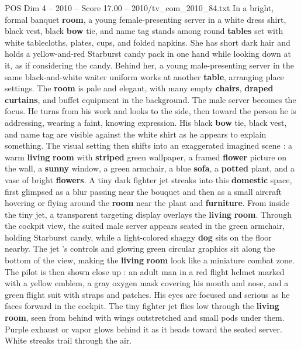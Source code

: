 \begin{textsample}{POS Dim 4 – 2010 – Score 17.00 – 2010/tv\_com\_2010\_84.txt}  \label{ex:f4_pos_028}
In a bright, formal banquet \textbf{room}, a young female-presenting server in a white dress shirt, black vest, black \textbf{bow} tie, and name tag stands among round \textbf{tables} set with white tablecloths, plates, cups, and folded napkins.
She has short dark hair and holds a yellow-and-red Starburst candy pack in one hand while looking down at it, as if considering the candy.
Behind her, a young male-presenting server in the same black-and-white waiter uniform works at another \textbf{table}, arranging place settings.
The \textbf{room} is pale and elegant, with many empty \textbf{chairs}, \textbf{draped} \textbf{curtains}, and buffet equipment in the background.
The male server becomes the focus.
He turns from his work and looks to the side, then toward the person he is addressing, wearing a faint, knowing expression.
His black \textbf{bow} tie, black vest, and name tag are visible against the white shirt as he appears to explain something.
The visual setting then shifts into an exaggerated imagined scene : a warm \textbf{living} \textbf{room} with \textbf{striped} green wallpaper, a framed \textbf{flower} picture on the wall, a \textbf{sunny} window, a green armchair, a blue \textbf{sofa}, a \textbf{potted} plant, and a vase of bright \textbf{flowers}.
A tiny dark fighter jet streaks into this \textbf{domestic} space, first glimpsed as a blur passing near the bouquet and then as a small aircraft hovering or flying around the \textbf{room} near the plant and \textbf{furniture}.
From inside the tiny jet, a transparent targeting display overlays the \textbf{living} \textbf{room}.
Through the cockpit view, the suited male server appears seated in the green armchair, holding Starburst candy, while a light-colored shaggy \textbf{dog} sits on the floor nearby.
The jet ’s controls and glowing green circular graphics sit along the bottom of the view, making the \textbf{living} \textbf{room} look like a miniature combat zone.
The pilot is then shown close up : an adult man in a red flight helmet marked with a yellow emblem, a gray oxygen mask covering his mouth and nose, and a green flight suit with straps and patches.
His eyes are focused and serious as he faces forward in the cockpit.
The tiny fighter jet flies low through the \textbf{living} \textbf{room}, seen from behind with wings outstretched and small pods under them.
Purple exhaust or vapor glows behind it as it heads toward the seated server.
White streaks trail through the air.

\end{textsample}
